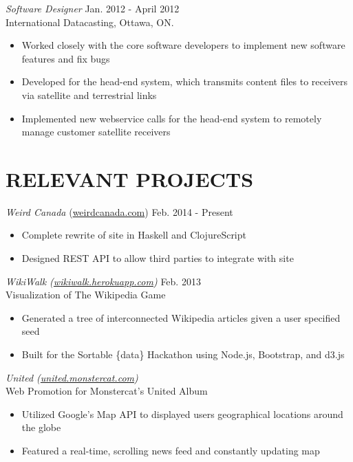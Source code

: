 \documentclass[margin]{res}
\begin{document}
\begin{resume}
{\sl Software Designer} \hfill Jan. 2012 - April 2012 \\
International Datacasting, Ottawa, ON.
\begin{itemize}  \itemsep -2pt %
  \item Worked closely with the core software developers to implement new software features and fix bugs
  \item Developed for the head-end system, which transmits content files to receivers via satellite and terrestrial links
  \item Implemented new webservice calls for the head-end system to remotely manage customer satellite receivers
\end{itemize}

\section{RELEVANT PROJECTS}

{\sl Weird Canada} (\href{http://weirdcanada.com}{weirdcanada.com}) \hfill Feb. 2014 - Present
\begin{itemize} \itemsep -2pt
  \item Complete rewrite of site in Haskell and ClojureScript
  \item Designed REST API to allow third parties to integrate with site
\end{itemize}

{\sl WikiWalk (\href{http://wikiwalk.herokuapp.com}{wikiwalk.herokuapp.com}) } \hfill Feb. 2013 \\
Visualization of The Wikipedia Game
\begin{itemize} \itemsep -2pt
  \item Generated a tree of interconnected Wikipedia articles given a user specified seed
  \item Built for the Sortable \{data\} Hackathon using Node.js, Bootstrap, and d3.js
\end{itemize}

{\sl United (\href{http://united.monstercat.com}{united.monstercat.com}) } \\
Web Promotion for Monstercat's United Album
\begin{itemize} \itemsep -2pt
  \item Utilized Google's Map API to displayed users geographical locations around the globe
  \item Featured a real-time, scrolling news feed and constantly updating map
\end{itemize}


\end{resume}
\end{document}
